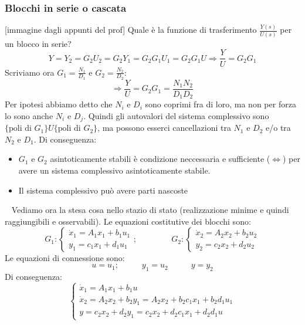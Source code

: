 \subsubsection{Blocchi in serie o cascata}
[immagine dagli appunti del prof]\newline
Quale è la funzione di trasferimento $\frac{Y(s)}{U(s)}$ per un blocco in serie?
\[
    Y= Y_2 = G_2U_2 = G_2 Y_1 = G_2G_1 U_1 = G_2G_1 U \Longrightarrow \frac{Y}{U} = G_2G_1
\]
Scriviamo ora $G_1 = \frac{N_1}{D_1}$ e $G_2= \frac{N_2}{D_2}$:
\[
    \Longrightarrow \frac{Y}{U} = G_2 G_1 = \frac{N_1N_2}{D_1D_2}
\]
Per ipotesi abbiamo detto che $N_i$ e $D_i$ sono coprimi fra di loro, ma non per forza lo sono anche $N_i$ e $D_j$.\newline
Quindi gli autovalori del sistema complessivo sono $\{\text{poli di $G_1$}\} U \{\text{poli di $G_2$}\}$, ma possono esserci cancellazioni tra $N_1$ e $D_2$ e/o tra $N_2$ e $D_1$.\newline
Di conseguenza:
\begin{itemize}
    \item $G_1$ e $G_2$ asintoticamente stabili è condizione neccessaria e sufficiente ($\Leftrightarrow$) per avere un sistema complessivo asintoticamente stabile.
    \item Il sistema complessivo può avere parti nascoste
\end{itemize} 
\ \newline
Vediamo ora la stesa cosa nello stazio di stato (realizzazione minime e quindi raggiungibili e osservabili).
Le equazioni costitutive dei blocchi sono:
\[
    G_1: \begin{cases}
        \dot{x}_1 = A_1 x_1 + b_1 u_1\\
        y_1 = c_1 x_1 + d_1 u_1
    \end{cases}; \;\;\;\;\;\;\;\;\;\;\;\;\;\;\;G_2 : \begin{cases}
        \dot{x}_2 = A_2 x_2 + b_2 u_2\\
        y_2 = c_2 x_2 + d_2 u_2
    \end{cases}
\]
Le equazioni di connessione sono:
\[
    u = u_1; \;\;\;\;\;\;\;\;\;\;y_1 = u_2 \;\;\;\;\;\;\;\;\;\;y=y_2
\]
Di conseguenza:
\[
    \begin{cases}
        \dot{x}_1 = A_1 x_1 + b_1 u\\
        \dot{x}_2 = A_2 x_2 + b_2 y_1 = A_2 x_2 + b_2 c_1x_1 + b_2 d_1 u_1\\
        y = c_2 x_2 + d_2 y_1 = c_2 x_2 + d_2 c_1 x_1 + d_2 d_1 u
    \end{cases}
\]
